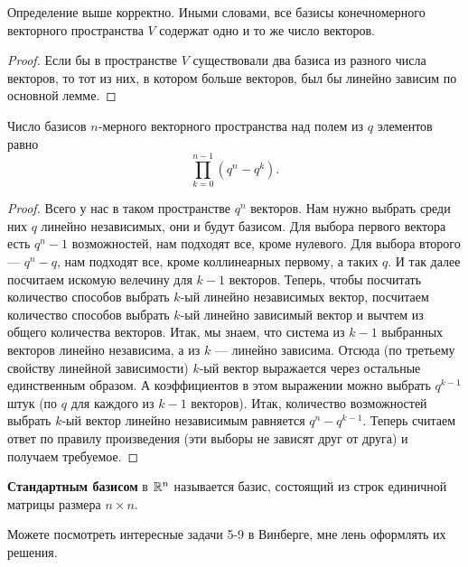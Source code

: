 \begin{theorem}
    Определение выше корректно. Иными словами, все базисы конечномерного векторного пространства $V$ содержат одно и то же число векторов.
\end{theorem}

\begin{proof}
    Если бы в пространстве $V$ существовали два базиса из разного числа векторов, то тот из них, в котором больше векторов, был бы линейно зависим по основной лемме.
\end{proof}

\begin{statement}
    Число базисов $n$-мерного векторного пространства над полем из $q$ элементов равно
    $$
    \prod_{k = 0}^{n - 1}(q^n - q^k).
    $$
\end{statement}

\begin{proof}
    Всего у нас в таком пространстве $q^n$ векторов. Нам нужно выбрать среди них $q$ линейно независимых, они и будут базисом. Для выбора первого вектора есть $q^n - 1$ возможностей, нам подходят все, кроме нулевого. Для выбора второго --- $q^n - q$, нам подходят все, кроме коллинеарных первому, а таких $q$. И так далее посчитаем искомую велечину для $k - 1$ векторов. Теперь, чтобы посчитать количество способов выбрать $k$-ый линейно независимых вектор, посчитаем количество способов выбрать $k$-ый линейно зависимый вектор и вычтем из общего количества векторов. Итак, мы знаем, что система из $k - 1$ выбранных векторов линейно независима, а из $k$ --- линейно зависима. Отсюда (по третьему свойству линейной зависимости) $k$-ый вектор выражается через остальные единственным образом. А коэффициентов в этом выражении можно выбрать $q^{k - 1}$ штук (по $q$ для каждого из $k - 1$ векторов). Итак, количество возможностей выбрать $k$-ый вектор линейно независимым равняется $q^n - q^{k - 1}$. Теперь считаем ответ по правилу произведения (эти выборы не зависят друг от друга) и получаем требуемое.
\end{proof}

\begin{definition}
    \textbf{Стандартным базисом} в $\mathbb{R}^n$ называется базис, состоящий из строк единичной матрицы размера $n \times n$.
\end{definition}

\begin{remark}
    Можете посмотреть интересные задачи 5-9 в Винберге, мне лень оформлять их решения.
\end{remark}

